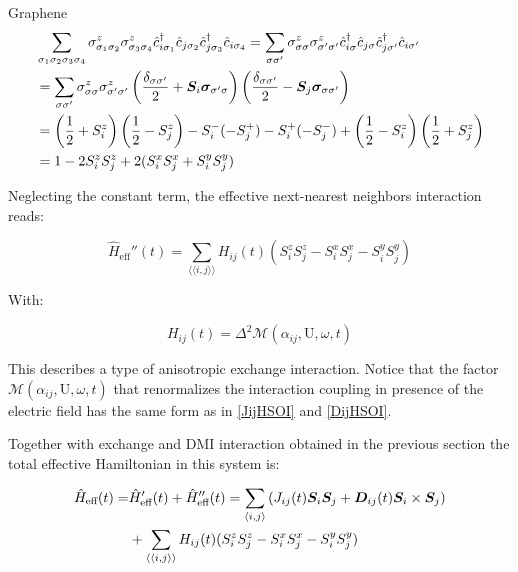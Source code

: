 \begin{section}{Graphene}
\begin{align*}
&\sum_{\sigma_1 \sigma_2 \sigma_3 \sigma_4} \sigma_{\sigma_1 \sigma_2}^z\sigma_{\sigma_3 \sigma_4}^z \hat{c}_{i\sigma_1}^\dagger\hat{c}_{j\sigma_2}\hat{c}_{j\sigma_3}^\dagger\hat{c}_{i\sigma_4} = \sum_{\sigma \sigma'} \sigma_{\sigma \sigma}^z\sigma_{\sigma' \sigma'}^z \hat{c}_{i\sigma}^\dagger\hat{c}_{j\sigma}\hat{c}_{j\sigma'}^\dagger\hat{c}_{i\sigma'} \\
&= \sum_{\sigma \sigma'} \sigma_{\sigma \sigma}^z\sigma_{\sigma' \sigma'}^z \left( \frac{\delta_{\sigma\sigma'}}{2} + \boldsymbol{S}_i\boldsymbol{\sigma}_{\sigma'\sigma}\right)\left( \frac{\delta_{\sigma\sigma'}}{2} - \boldsymbol{S}_j\boldsymbol{\sigma}_{\sigma\sigma'}\right) \\
&= \left( \frac{1}{2}+S_i^z \right) \left( \frac{1}{2}-S_j^z \right) - S_i^-(-S_j^+)-S_i^+(-S_j^-) + \left( \frac{1}{2}-S_i^z \right) \left( \frac{1}{2}+S_j^z \right) \\
&= 1-2S_i^zS_j^z+2(S_i^xS_j^x+S_i^yS_j^y)
\end{align*}

Neglecting the constant term, the effective next-nearest neighbors interaction reads:

\begin{equation}
\hat{H}_{\text{eff}}''(t) = \sum_{\langle \langle i,j \rangle \rangle} H_{ij}(t) (S_i^zS_j^z - S_i^xS_j^x - S_i^yS_j^y)
\end{equation}

With:

\begin{equation}
H_{ij}(t) = \Delta^2 \mathcal{M}(\alpha_{ij}, \text{U}, \omega, t)
\end{equation}

This describes a type of anisotropic exchange interaction. Notice that the factor $\mathcal{M}(\alpha_{ij}, \text{U}, \omega, t)$ that renormalizes the interaction coupling in presence of the electric field has the same form as in \ref{JijHSOI} and \ref{DijHSOI}.


Together with exchange and DMI interaction obtained in the previous section the total effective Hamiltonian in this system is:

\begin{align}
\hat{H}_{\text{eff}}(t) = &\hat{H}_{\text{eff}}'(t) + \hat{H}_{\text{eff}}''(t) = \sum_{\langle i,j \rangle} \left( J_{ij}(t)\boldsymbol{S}_i\boldsymbol{S}_j + \boldsymbol{D}_{ij}(t) \boldsymbol{S}_i \times \boldsymbol{S}_j \right) \nonumber \\
&+ \sum_{\langle \langle i,j \rangle \rangle} H_{ij}(t) (S_i^zS_j^z - S_i^xS_j^x - S_i^yS_j^y)
\end{align}


\end{section}
